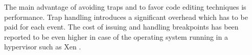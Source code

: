 The main advantage of avoiding traps and to favor code editing
techniques is performance. Trap handling introduces a significant
overhead which has to be paid for each event. The cost
of issuing and handling breakpoints has been reported to be even 
higher in case of the operating system running in a hypervisor such as 
Xen \cite{Hiramatsu07}. 








%
%
%
%



